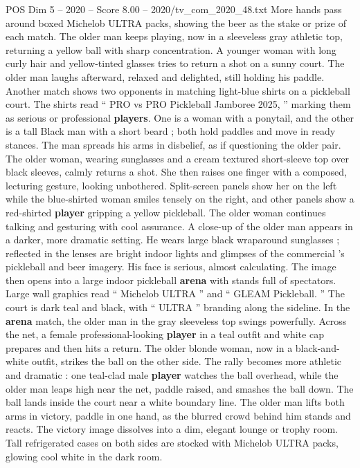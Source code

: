 \begin{textsample}{POS Dim 5 – 2020 – Score 8.00 – 2020/tv\_com\_2020\_48.txt}
More hands pass around boxed Michelob ULTRA packs, showing the beer as the stake or prize of each match.
The older man keeps playing, now in a sleeveless gray athletic top, returning a yellow ball with sharp concentration.
A younger woman with long curly hair and yellow-tinted glasses tries to return a shot on a sunny court.
The older man laughs afterward, relaxed and delighted, still holding his paddle.
Another match shows two opponents in matching light-blue shirts on a pickleball court.
The shirts read “ PRO vs PRO Pickleball Jamboree 2025, ” marking them as serious or professional \textbf{players}.
One is a woman with a ponytail, and the other is a tall Black man with a short beard ; both hold paddles and move in ready stances.
The man spreads his arms in disbelief, as if questioning the older pair.
The older woman, wearing sunglasses and a cream textured short-sleeve top over black sleeves, calmly returns a shot.
She then raises one finger with a composed, lecturing gesture, looking unbothered.
Split-screen panels show her on the left while the blue-shirted woman smiles tensely on the right, and other panels show a red-shirted \textbf{player} gripping a yellow pickleball.
The older woman continues talking and gesturing with cool assurance.
A close-up of the older man appears in a darker, more dramatic setting.
He wears large black wraparound sunglasses ; reflected in the lenses are bright indoor lights and glimpses of the commercial ’s pickleball and beer imagery.
His face is serious, almost calculating.
The image then opens into a large indoor pickleball \textbf{arena} with stands full of spectators.
Large wall graphics read “ Michelob ULTRA ” and “ GLEAM Pickleball. ” The court is dark teal and black, with “ ULTRA ” branding along the sideline.
In the \textbf{arena} match, the older man in the gray sleeveless top swings powerfully.
Across the net, a female professional-looking \textbf{player} in a teal outfit and white cap prepares and then hits a return.
The older blonde woman, now in a black-and-white outfit, strikes the ball on the other side.
The rally becomes more athletic and dramatic : one teal-clad male \textbf{player} watches the ball overhead, while the older man leaps high near the net, paddle raised, and smashes the ball down.
The ball lands inside the court near a white boundary line.
The older man lifts both arms in victory, paddle in one hand, as the blurred crowd behind him stands and reacts.
The victory image dissolves into a dim, elegant lounge or trophy room.
Tall refrigerated cases on both sides are stocked with Michelob ULTRA packs, glowing cool white in the dark room.

\end{textsample}
